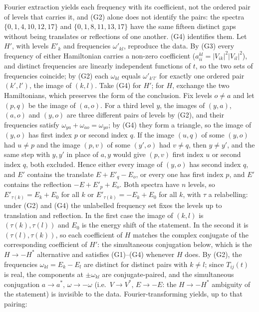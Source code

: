 \documentclass[
]{article}
\begin{document}
Fourier extraction yields each frequency with its coefficient, not the
ordered pair of levels that carries it, and (G2) alone does not identify
the pairs: the spectra \(\{0,1,4,10,12,17\}\) and \(\{0,1,8,11,13,17\}\)
have the same fifteen distinct gaps without being translates or
reflections of one another. (G4) identifies them. Let \(H'\), with
levels \(E'_k\) and frequencies \(\omega'_{kl}\), reproduce the data. By
(G3) every frequency of either Hamiltonian carries a non-zero
coefficient (\(a_{ii}^{kl} = |V_{ik}|^2 |V_{il}|^2\)), and distinct
frequencies are linearly independent functions of \(t\), so the two sets
of frequencies coincide; by (G2) each \(\omega_{kl}\) equals
\(\omega'_{k'l'}\) for exactly one ordered pair \((k',l')\), the image
of \((k,l)\). Take (G4) for \(H'\); for \(H\), exchange the two
Hamiltonians, which preserves the form of the conclusion. Fix levels
\(o \neq a\) and let \((p,q)\) be the image of \((a,o)\). For a third
level \(y\), the images of \((y,a)\), \((a,o)\) and \((y,o)\) are three
different pairs of levels by (G2), and their frequencies satisfy
\(\omega_{ya} + \omega_{ao} = \omega_{yo}\); by (G4) they form a
triangle, so the image of \((y,o)\) has first index \(p\) or second
index \(q\). If the image \((u,q)\) of some \((y,o)\) had \(u \neq p\)
and the image \((p,v)\) of some \((y',o)\) had \(v \neq q\), then
\(y \neq y'\), and the same step with \(y, y'\) in place of \(a, y\)
would give \((p,v)\) first index \(u\) or second index \(q\), both
excluded. Hence either every image of \((y,o)\) has second index \(q\),
and \(E'\) contains the translate \(E + E'_q - E_o\), or every one has
first index \(p\), and \(E'\) contains the reflection
\(-E + E'_p + E_o\). Both spectra have \(n\) levels, so
\(E'_{\tau(k)} = E_k + E_0\) for all \(k\) or
\(E'_{\tau(k)} = -E_k + E_0\) for all \(k\), with \(\tau\) a
relabelling: under (G2) and (G4) the unlabelled frequency set fixes the
levels up to translation and reflection. In the first case the image of
\((k,l)\) is \((\tau(k), \tau(l))\) and \(E_0\) is the energy shift of
the statement. In the second it is \((\tau(l), \tau(k))\), so each
coefficient of \(H\) matches the complex conjugate of the corresponding
coefficient of \(H'\): the simultaneous conjugation below, which is the
\(H \to -H^*\) alternative and satisfies (G1)--(G4) whenever \(H\) does.
By (G2), the frequencies \(\omega_{kl} = E_k - E_l\) are distinct for
distinct pairs with \(k \neq l\); since \(T_{ij}(t)\) is real, the
components at \(\pm\omega_{kl}\) are conjugate-paired, and the
simultaneous conjugation \(a \to a^*\), \(\omega \to -\omega\)
(i.e.~\(V \to V^*\), \(E \to -E\): the \(H \to -H^*\) ambiguity of the
statement) is invisible to the data. Fourier-transforming yields, up to
that pairing:
\end{document}
